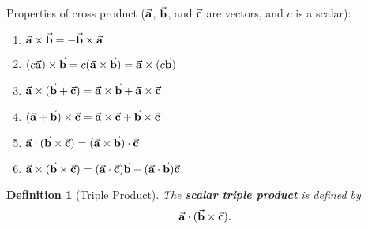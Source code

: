 \documentclass[12pt,a4paper]{article}
\newtheorem{df}{Definition}[subsection]
\def\veca{\va{a}}
\def\vecb{\va{b}}
\def\vecc{\va{c}}
\begin{document}
Properties of cross product ($\veca$, $\vecb$, and $\vecc$ are vectors, and $c$ is a scalar): 
\begin{enumerate}
	\item $\veca\times\vecb=-\vecb\times\veca$
	\item $(c\veca)\times\vecb=c(\veca\times\vecb)=\veca\times(c\vecb)$
	\item $\veca\times(\vecb+\vecc)=\veca\times\vecb+\veca\times\vecc$
	\item $(\veca+\vecb)\times\vecc=\veca\times\vecc+\vecb\times\vecc$
	\item $\veca\cdot(\vecb\times\vecc)=(\veca\times\vecb)\cdot\vecc$
	\item $\veca\times(\vecb\times\vecc)=(\veca\cdot\vecc)\vecb-(\veca\cdot\vecb)\vecc$
\end{enumerate}
\begin{df}[Triple Product]
	The \textbf{scalar triple product} is defined by \[\veca\cdot(\vecb\times\vecc).\]
\end{df}
\end{document}
